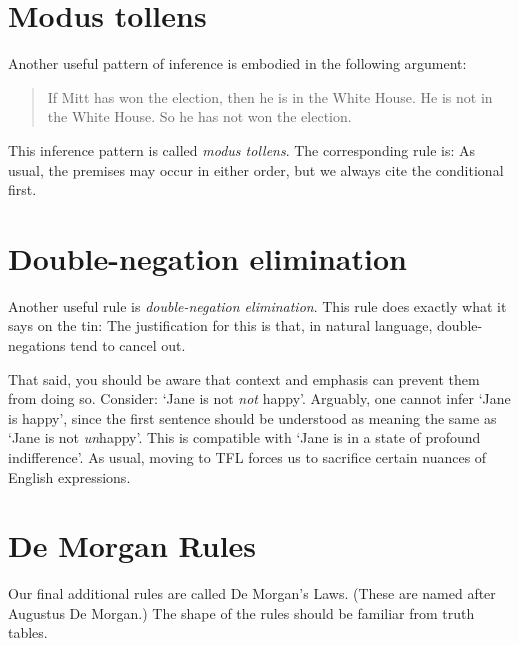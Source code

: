 \section{Modus tollens}
Another useful pattern of inference is embodied in the following argument:
	\begin{quote}
		If Mitt has won the election, then he is in the White House. He is not in the White House. So he has not won the election.
	\end{quote}
This inference pattern is called \emph{modus tollens}. The corresponding rule is:
As usual, the premises may occur in either order, but we always cite the conditional first. 

\section{Double-negation elimination}
Another useful rule is \emph{double-negation elimination}. This rule does exactly what it says on the tin:
The justification for this is that, in natural language, double-negations tend to cancel out. 

That said, you should be aware that context and emphasis can prevent them from doing so. Consider: `Jane is not \emph{not} happy'. Arguably, one cannot infer `Jane is happy', since the first sentence should be understood as meaning the same as  `Jane is not \emph{un}happy'. This is compatible with `Jane is in a state of profound indifference'. As usual, moving to TFL forces us to sacrifice certain nuances of English expressions.

\section{De Morgan Rules}
Our final additional rules are called De Morgan's Laws. (These are named after Augustus De Morgan.) The shape of the rules should be familiar from truth tables.

